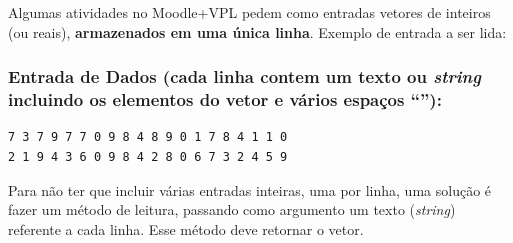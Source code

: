 \documentclass[12pt,a4paper]{article}
\begin{document}
Algumas atividades no Moodle+VPL pedem como entradas vetores de inteiros
(ou reais), \textbf{armazenados em uma única linha}. Exemplo de entrada
a ser lida:

\hypertarget{entrada-de-dados-cada-linha-contem-um-texto-ou-string-incluindo-os-elementos-do-vetor-e-vuxe1rios-espauxe7os}{%
\subsubsection{\texorpdfstring{Entrada de Dados (cada linha contem um
texto ou \emph{string} incluindo os elementos do vetor e vários espaços
``\texttt{}''):}{Entrada de Dados (cada linha contem um texto ou string incluindo os elementos do vetor e vários espaços ``\,''):}}\label{entrada-de-dados-cada-linha-contem-um-texto-ou-string-incluindo-os-elementos-do-vetor-e-vuxe1rios-espauxe7os}}

\begin{verbatim}
7 3 7 9 7 7 0 9 8 4 8 9 0 1 7 8 4 1 1 0 
2 1 9 4 3 6 0 9 8 4 2 8 0 6 7 3 2 4 5 9
\end{verbatim}

Para não ter que incluir várias entradas inteiras, uma por linha, uma
solução é fazer um método de leitura, passando como argumento um texto
(\emph{string}) referente a cada linha. Esse método deve retornar o
vetor.
\end{document}
